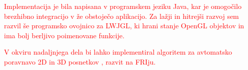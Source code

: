 \documentclass[a4paper, 12pt]{book}
\begin{document}
\textcolor{red}{Implementacija je bila napisana v programskem jeziku Java, kar je omogočilo brezhibno integracijo v že obstoječo aplikacijo. Za lažji in hitrejši razvoj sem razvil še programsko ovojnico za LWJGL, ki hrani stanje OpenGL objektov in ima bolj berljivo poimenovane funkcije.}

\textcolor{red}{V okviru nadaljnjega dela bi lahko implementiral algoritem za avtomatsko poravnavo 2D in 3D posnetkov \cite{6507588}, razvit na FRIju.}



\end{document}
